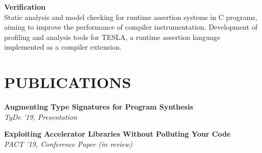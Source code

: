 \documentclass[margin]{res}
\begin{document}
\begin{resume}
\par
\textbf{Verification}\\
Static analysis and model checking for runtime assertion systems in C programs,
aiming to improve the performance of compiler instrumentation. Development of
profiling and analysis tools for TESLA, a runtime assertion language implemented
as a compiler extension.

\section{PUBLICATIONS}

\par
\textbf{Augmenting Type Signatures for Program Synthesis}\\
\emph{TyDe '19, Presentation}

\par
\textbf{Exploiting Accelerator Libraries Without Polluting Your Code}\\
\emph{PACT '19, Conference Paper (in review)}







\end{resume}
\end{document}
